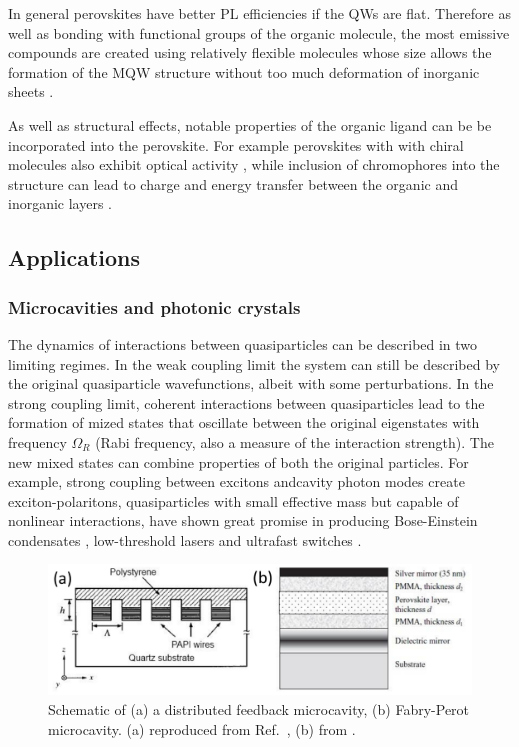 In general perovskites have better PL efficiencies if the QWs are flat. Therefore as well as bonding with functional groups of the organic molecule, the most emissive compounds are created using relatively flexible molecules whose size allows the formation of the MQW structure without too much deformation of inorganic sheets \cite{Zhang2009}.

As well as structural effects, notable properties of the organic ligand can be be incorporated into the perovskite. For example perovskites with with chiral molecules also exhibit optical activity \cite{Teshima2003}, while inclusion of chromophores into the structure can lead to charge and energy transfer between the organic and inorganic layers \cite{Kawabata2009, Mitzi1999a, Braun1999}.

\subsection{Applications}
\subsubsection{Microcavities and photonic crystals}
The dynamics of interactions between quasiparticles can be described in two limiting regimes. In the weak coupling limit the system can still be described by the original quasiparticle wavefunctions, albeit with some perturbations. In the strong coupling limit, coherent interactions between quasiparticles lead to the formation of mized states that oscillate between the original eigenstates with frequency $\Omega_R$ (Rabi frequency, also a measure of the interaction strength). The new mixed states can combine properties of both the original particles. For example, strong coupling between excitons andcavity photon modes create exciton-polaritons, quasiparticles with small effective mass but capable of nonlinear interactions, have shown great promise in producing Bose-Einstein condensates \cite{Kasprzak2006}, low-threshold lasers \cite{Christopoulos2007} and ultrafast switches \cite{Amo2010}.
\begin{figure}[h!]
\centering
\includegraphics[width=\textwidth]{Fig20}
\caption{Schematic of (a) a distributed feedback microcavity, (b) Fabry-Perot microcavity. (a) reproduced from Ref.\ \cite{Fujita1998}, (b) from \cite{Lanty2008}.}
\label{2Fig20}
\end{figure}

